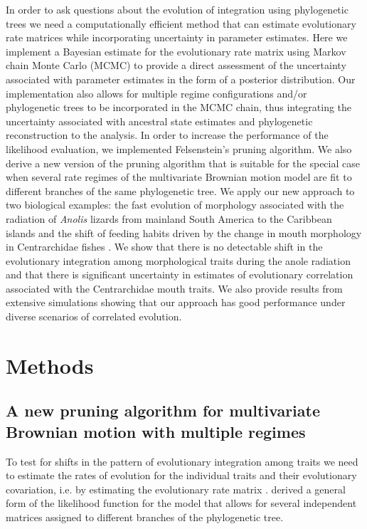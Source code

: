 In order to ask questions about the evolution of integration using phylogenetic trees we need a computationally efficient method that can estimate evolutionary rate matrices while incorporating uncertainty in parameter estimates. Here we implement a Bayesian estimate for the evolutionary rate matrix using Markov chain Monte Carlo (MCMC) to provide a direct assessment of the uncertainty associated with parameter estimates in the form of a posterior distribution. Our implementation also allows for multiple regime configurations and/or phylogenetic trees to be incorporated in the MCMC chain, thus integrating the uncertainty associated with ancestral state estimates and phylogenetic reconstruction to the analysis. In order to increase the performance of the likelihood evaluation, we implemented Felsenstein's \citeyearpar{felsenstein_1973} pruning algorithm. We also derive a new version of the pruning algorithm that is suitable for the special case when several rate regimes of the multivariate Brownian motion model are fit to different branches of the same phylogenetic tree. We apply our new approach to two biological examples: the fast evolution of morphology associated with the radiation of \textit{Anolis} lizards from mainland South America to the Caribbean islands \citep{pinto_testing_2008, mahler_exceptional_2013, moreno-arias_patterns_2016} and the shift of feeding habits driven by the change in mouth morphology in Centrarchidae fishes \citep{revell_phylogenetic_2009}. We show that there is no detectable shift in the evolutionary integration among morphological traits during the anole radiation and that there is significant uncertainty in estimates of evolutionary correlation associated with the Centrarchidae mouth traits. We also provide results from extensive simulations showing that our approach has good performance under diverse scenarios of correlated evolution.

\section{Methods}

\subsection{A new pruning algorithm for multivariate Brownian motion with multiple regimes}

To test for shifts in the pattern of evolutionary integration among traits we need to estimate the rates of evolution for the individual traits and their evolutionary covariation, i.e. by estimating the evolutionary rate matrix \citep[$\mathbf{R}$;][]{revell_testing_2008}. \citet{revell_phylogenetic_2009} derived a general form of the likelihood function for the model that allows for several independent matrices assigned to different branches of the phylogenetic tree.

